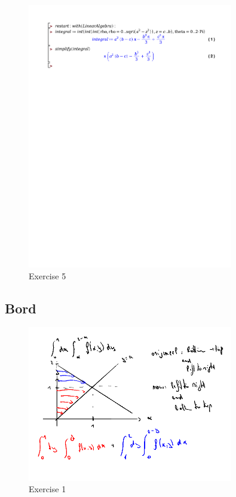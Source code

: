 \documentclass[a4paper]{report}
\begin{document}
\begin{figure}[H]
	\centering
	\includegraphics[width=0.8\textwidth]{exercises/huis_5_ex_5.pdf}
	\caption{Exercise 5}
	\label{fig:huis_5_ex_5_maple}
\end{figure}

\subsection{Bord}

\begin{figure}[H]
	\centering
	\includegraphics[width=0.8\textwidth]{assets/bord_5_ex_1.png}
	\caption{Exercise 1}
	\label{fig:bord_5_ex_1}
\end{figure}
\end{document}
